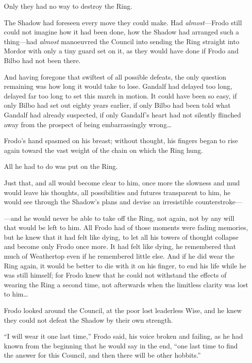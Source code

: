 Only they had no way to destroy the Ring.

The Shadow had foreseen every move they could make. Had \emph{almost}—Frodo still could not imagine how it had been done, how the Shadow had arranged such a thing—had \emph{almost} manoeuvred the Council into sending the Ring straight into Mordor with only a tiny guard set on it, as they would have done if Frodo and Bilbo had not been there.

And having foregone that swiftest of all possible defeats, the only question remaining was how long it would take to lose. Gandalf had delayed too long, delayed far too long to set this march in motion. It could have been so easy, if only Bilbo had set out eighty years earlier, if only Bilbo had been told what Gandalf had already suspected, if only Gandalf’s heart had not silently flinched away from the prospect of being embarrassingly wrong…

Frodo’s hand spasmed on his breast; without thought, his fingers began to rise again toward the vast weight of the chain on which the Ring hung.

All he had to do was put on the Ring.

Just that, and all would become clear to him, once more the slowness and mud would leave his thoughts, all possibilities and futures transparent to him, he would see through the Shadow’s plans and devise an irresistible counterstroke—

—and he would never be able to take off the Ring, not again, not by any will that would be left to him. All Frodo had of those moments were fading memories, but he knew that it had felt like dying, to let all his towers of thought collapse and become only Frodo once more. It had felt like dying, he remembered that much of Weathertop even if he remembered little else. And if he did wear the Ring again, it would be better to die with it on his finger, to end his life while he was still himself; for Frodo knew that he could not withstand the effects of wearing the Ring a second time, not afterwards when the limitless clarity was lost to him…

Frodo looked around the Council, at the poor lost leaderless Wise, and he knew they could not defeat the Shadow by their own strength.

“I will wear it one last time,” Frodo said, his voice broken and failing, as he had known from the beginning that he would say in the end, “one last time to find the answer for this Council, and then there will be other hobbits.”

